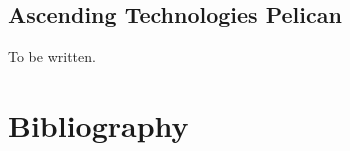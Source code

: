 \documentclass[a4paper]{article}
\begin{document}
\begin{appendices}
\newpage
\section{Ascending Technologies Pelican}
\label{pelican}
To be written.
\end{appendices}

\newpage

\section{Bibliography}
\renewcommand{\section}[2]{}


\end{document}

